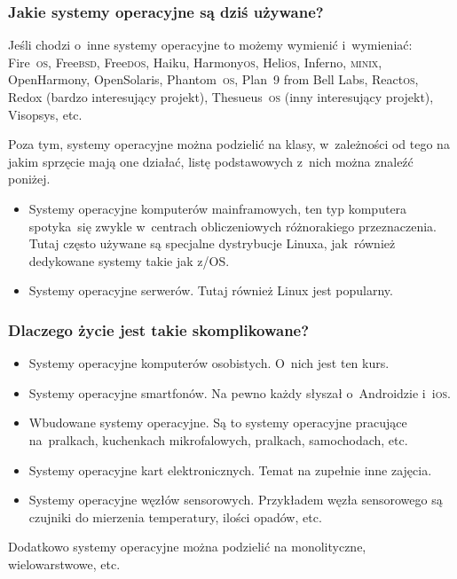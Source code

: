 \documentclass[10pt,t]{beamer}
\begin{document}
\begin{frame}
  \frametitle{Jakie systemy operacyjne są dziś używane?}


  Jeśli chodzi o~inne systemy operacyjne to możemy wymienić i~wymieniać:
  Fire~\textsc{os}, Free\textsc{bsd}, Free\textsc{dos}, Haiku,
  Harmony\textsc{os}, Heli\textsc{os}, Inferno, \textsc{minix},
  OpenHarmony, OpenSolaris, Phantom~\textsc{os}, Plan~9
  from Bell Labs, React\textsc{os}, Redox (bardzo interesujący projekt),
  Thesueus~\textsc{os} (inny interesujący projekt), Visopsys, etc.

  Poza tym, systemy operacyjne można podzielić na klasy, w~zależności od
  tego na jakim sprzęcie mają one działać, listę podstawowych z~nich można
  znaleźć poniżej.

  \begin{itemize}

  \item Systemy operacyjne komputerów mainframowych, ten typ komputera
    spotyka~się zwykle w~centrach obliczeniowych różnorakiego
    przeznaczenia. Tutaj często używane są specjalne dystrybucje Linuxa,
    jak~również dedykowane systemy takie jak z/OS.

  \item Systemy operacyjne serwerów. Tutaj również Linux jest popularny.

  \end{itemize}

\end{frame}





\begin{frame}
  \frametitle{Dlaczego życie jest takie skomplikowane?}


  \begin{itemize}

  \item Systemy operacyjne komputerów osobistych. O~nich jest ten kurs.

  \item Systemy operacyjne smartfonów. Na pewno każdy słyszał o~Androidzie
    i~i\textsc{os}.

  \item Wbudowane systemy operacyjne. Są to systemy operacyjne pracujące
    na~pralkach, kuchenkach mikrofalowych, pralkach, samochodach, etc.

  \item Systemy operacyjne kart elektronicznych. Temat na zupełnie inne
    zajęcia.

  \item Systemy operacyjne węzłów sensorowych. Przykładem węzła sensorowego
    są czujniki do mierzenia temperatury, ilości opadów, etc.

  \end{itemize}

  Dodatkowo systemy operacyjne można podzielić na monolityczne,
  wielowarstwowe, etc.

\end{frame}
\end{document}
